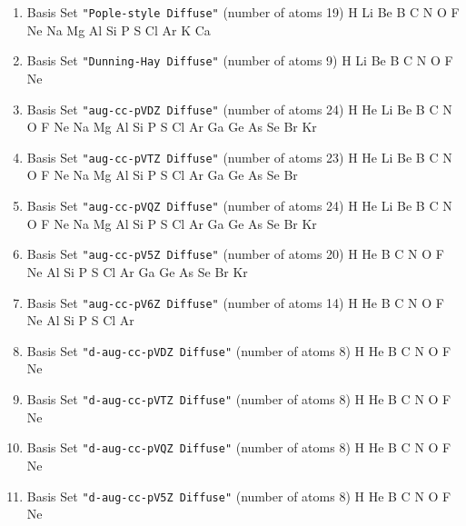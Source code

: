 \begin{enumerate}

\item Basis Set \verb#"Pople-style Diffuse"# (number of atoms 19)  \newline
  H Li Be B C N O F Ne Na Mg Al Si P S Cl Ar K Ca

\item Basis Set \verb#"Dunning-Hay Diffuse"# (number of atoms 9)  \newline
  H Li Be B C N O F Ne


\item Basis Set \verb#"aug-cc-pVDZ Diffuse"# (number of atoms 24)  \newline
  H He Li Be B C N O F Ne Na Mg Al Si P S Cl Ar Ga Ge As Se Br Kr


\item Basis Set \verb#"aug-cc-pVTZ Diffuse"# (number of atoms 23)  \newline
  H He Li Be B C N O F Ne Na Mg Al Si P S Cl Ar Ga Ge As Se Br


\item Basis Set \verb#"aug-cc-pVQZ Diffuse"# (number of atoms 24)  \newline
  H He Li Be B C N O F Ne Na Mg Al Si P S Cl Ar Ga Ge As Se Br Kr


\item Basis Set \verb#"aug-cc-pV5Z Diffuse"# (number of atoms 20)  \newline
  H He B C N O F Ne Al Si P S Cl Ar Ga Ge As Se Br Kr


\item Basis Set \verb#"aug-cc-pV6Z Diffuse"# (number of atoms 14)  \newline
  H He B C N O F Ne Al Si P S Cl Ar


\item Basis Set \verb#"d-aug-cc-pVDZ Diffuse"# (number of atoms 8)  \newline
  H He B C N O F Ne


\item Basis Set \verb#"d-aug-cc-pVTZ Diffuse"# (number of atoms 8)  \newline
  H He B C N O F Ne


\item Basis Set \verb#"d-aug-cc-pVQZ Diffuse"# (number of atoms 8)  \newline
  H He B C N O F Ne

\item Basis Set \verb#"d-aug-cc-pV5Z Diffuse"# (number of atoms 8)  \newline
  H He B C N O F Ne



\end{enumerate}
